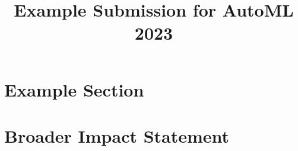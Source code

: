 \documentclass[11pt]{article}
\title{Example Submission for AutoML 2023}
\author[1]{\nameemail{Author 1}{email1@example.com}}
\affil[1]{Institution 1}
\begin{document}
\maketitle

\begin{abstract}
\end{abstract}


\section{Example Section} %


\section{Broader Impact Statement}
%
%
%
%
%
\end{document}
